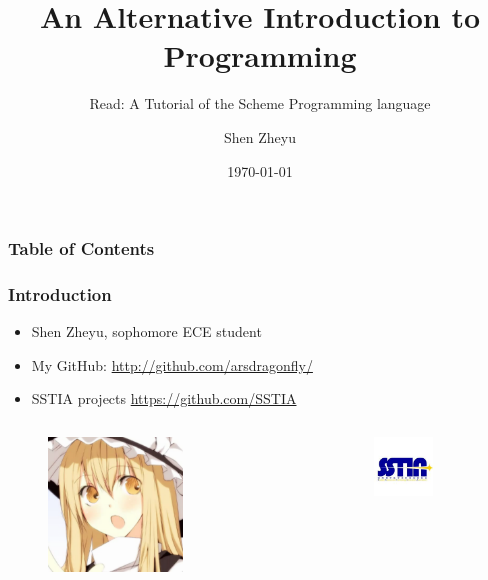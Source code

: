 \documentclass[xcolor=pdftex,dvipsnames,table]{beamer}
\title{An Alternative Introduction to Programming}
\subtitle{Read: A Tutorial of the Scheme Programming language}
\author{Shen Zheyu}
\date{\today}
\begin{document}
\maketitle
\begin{frame}[allowframebreaks]
  \frametitle{Table of Contents}
  \tableofcontents
\end{frame}
\begin{frame}
  \frametitle{Introduction}
  \begin{itemize}
    \item Shen Zheyu, sophomore ECE student
    \item My GitHub: \url{http://github.com/arsdragonfly/}
    \item SSTIA projects \url{https://github.com/SSTIA}
  \end{itemize}
  \begin{columns}
    \begin{column}{0.5\textwidth}
      \begin{center}
        \begin{figure}
          \includegraphics[width=0.6\textwidth]{avatar}
        \end{figure}
      \end{center}
    \end{column}
    \begin{column}{0.5\textwidth}
      \vspace*{\fill}
      \begin{center}
        \begin{figure}
          \includegraphics[width=0.6\textwidth]{SSTIA}

\end{figure}
\end{center}
\end{column}
\end{columns}
\end{frame}
\end{document}
